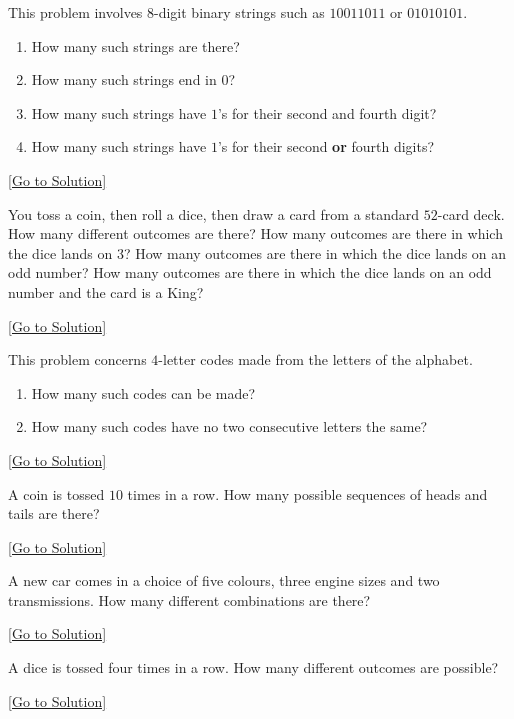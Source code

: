 \begin{exercise}\label{ex:2.22.5}
    This problem involves $8$-digit binary strings such as $10011011$ or $01010101$. 
    \begin{enumerate}
        \item How many such strings are there? 
        \item How many such strings end in $0$? 
        \item How many such strings have $1$'s for their second and fourth digit? 
        \item How many such strings have $1$'s for their second \textbf{or} fourth digits? 
    \end{enumerate}
\end{exercise}\hyperref[sol:2.22.5]{[Go to Solution]}

\begin{exercise}\label{ex:2.22.6}
    You toss a coin, then roll a dice, then draw a card from a standard $52$-card deck. How many different outcomes are there? How many outcomes are there in which the dice lands on $3$? How many outcomes are there in which the dice lands on an odd number? How many outcomes are there in which the dice lands on an odd number and the card is a King? 
\end{exercise}\hyperref[sol:2.22.6]{[Go to Solution]}

\begin{exercise}\label{ex:2.22.7}
    This problem concerns $4$-letter codes made from the letters of the alphabet. 
    \begin{enumerate}
        \item How many such codes can be made? 
        \item How many such codes have no two consecutive letters the same? 
    \end{enumerate}
\end{exercise}\hyperref[sol:2.22.7]{[Go to Solution]}

\begin{exercise}\label{ex:2.22.8}
    A coin is tossed $10$ times in a row. How many possible sequences of heads and tails are there? 
\end{exercise}\hyperref[sol:2.22.8]{[Go to Solution]}

\begin{exercise}\label{ex:2.22.9}
    A new car comes in a choice of five colours, three engine sizes and two transmissions. How many different combinations are there? 
\end{exercise}\hyperref[sol:2.22.9]{[Go to Solution]}

\begin{exercise}\label{ex:2.22.10}
    A dice is tossed four times in a row. How many different outcomes are possible? 
\end{exercise}\hyperref[sol:2.22.10]{[Go to Solution]}